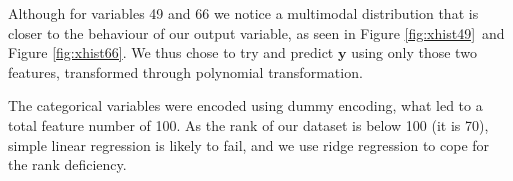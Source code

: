 \documentclass{article} %
\begin{document}
Although for variables 49 and 66 we notice a multimodal distribution that is
closer to the behaviour of our output variable, as seen in Figure
\ref{fig:xhist49} and Figure \ref{fig:xhist66}. We thus chose to try and predict
$\mathbf{y}$ using only those two features, transformed through polynomial
transformation.

The categorical variables were encoded using dummy encoding, what led to a total
feature number of 100. As the rank of our dataset is below 100 (it is 70),
simple linear regression is likely to fail, and we use ridge regression to cope
for the rank deficiency.

\begin{figure}[!t]
\center
{}
\hfill
{}
\hspace*{0.3in}
\end{figure}
\end{document}
